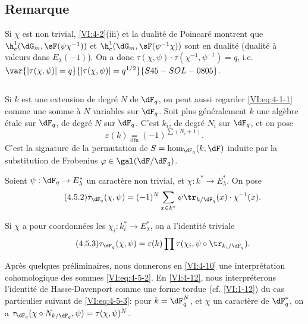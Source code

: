 \subsection{Remarque}\label{VI:4-4}

Si $\chi$ est non trivial, \ref{VI:4-2}(iii) et la dualité de Poincaré 
montrent que $\h_c^1(\dG_m,\sF(\psi\chi^{-1}))$ et 
$\h_c^1(\dG_m,\sF(\psi^{-1}\chi))$ sont en dualité (dualité à valeurs 
dans $E_\lambda(-1)$). On a donc 
$\tau(\chi,\psi)\cdot \tau(\chi^{-1},\psi^{-1}) = q$, i.e. 
$\var{|\tau(\chi,\psi)|=q}{|\tau(\chi,\psi)|=q^{1/2}}{S45-SOL-0805}$. 





\subsection{}\label{VI:4-5}

Si $k$ est une extension de degré $N$ de $\dF_q$, on peut aussi regarder 
\eqref{VI:eq:4-1-1} comme une somme à $N$ variables sur $\dF_q$. Soit plus 
généralement $k$ une algèbre étale sur $\dF_q$, de degré $N$ sur 
$\dF_q$. C'est  $k_i$, de degré $N_i$ sur $\dF_q$, et on pose 
\begin{equation*}\tag{4.5.1}\label{VI:eq:4-5-1}
  \varepsilon(k) \underset{\mathrm{dfn}}{=} (-1)^{\sum (N_i+1)} \text{.} 
\end{equation*}
C'est la signature de la permutation de $S=\hom_{\dF_q}(k,\dF)$ induite par la 
substitution de Frobenius $\varphi\in \gal(\dF/\dF_q)$. 

Soient $\psi:\dF_q\to E_\lambda^\ast$ un caractère non trivial, et 
$\chi:k^\ast \to E_\lambda^\ast$. On pose 
\begin{equation*}\tag{4.5.2}\label{VI:eq:4-5-2}
  \tau_{\dF_q}(\chi,\psi) = (-1)^N \sum_{x\in k^\ast} \psi \tr_{k/\dF_q}(x) \cdot \chi^{-1}(x) \text{.} 
\end{equation*}

Si $\chi$ a pour coordonnées les $\chi_i:k_i^\ast \to E_\lambda^\ast$, on 
a l'identité triviale 
\begin{equation*}\tag{4.5.3}\label{VI:eq:4-5-3}
  \tau_{\dF_q}(\chi,\psi) = \varepsilon(k) \prod \tau(\chi_i,\psi\circ \tr_{k_i/\dF_q}) \text{.}
\end{equation*}

Après quelques préliminaires, nous donnerons en \ref{VI:4-10} une 
interprétation cohomologique des sommes \eqref{VI:eq:4-5-2}. En 
\ref{VI:4-12}, nous interpréterons l'identité de Hasse-Davenport comme une 
forme tordue (cf. \ref{VI:1-12}) du cas particulier suivant de 
\eqref{VI:eq:4-5-3}: pour $k=\dF_q^N$, et $\chi$ un caractère de 
$\dF_q^\ast$, on a 
$\tau_{\dF_q}(\chi\circ N_{k/\dF_q},\psi)=\tau(\chi,\psi)^N$. 





